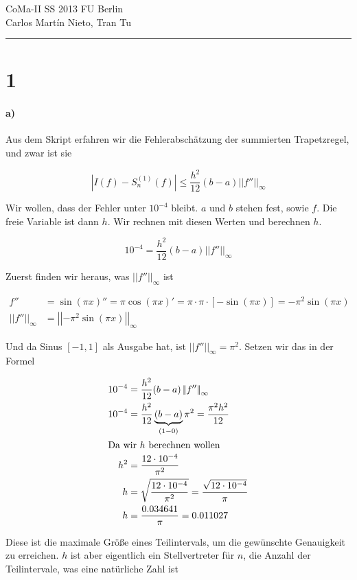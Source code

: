 \documentclass[ngerman,a4paper]{scrartcl}
\newcommand{\norm}[1]{\left|\!\left|#1\right|\! \right|}
\begin{document}
{\sffamily
  \hfill
  CoMa-II SS 2013\hfill
  FU Berlin\\[8pt]
  \hfill Carlos Martín Nieto, Tran Tu\hrule \bigskip
}

\section*{1}

\paragraph{a)}

Aus dem Skript erfahren wir die Fehlerabschätzung der summierten Trapetzregel, und zwar ist sie

\[
|I(f) - S^{(1)}_n(f)| \leq \frac{h^2}{12}(b-a)\norm{f''}_\infty
\]

Wir wollen, dass der Fehler unter $10^{-4}$ bleibt. $a$ und $b$ stehen fest, sowie $f$. Die freie Variable ist dann $h$. Wir rechnen mit diesen Werten und berechnen $h$.

\[
  10^{-4} = \frac{h^2}{12} (b-a) \norm{f''}_\infty
\]

Zuerst finden wir heraus, was $\norm{f''}_\infty$ ist


\begin{align*}
  f'' &= \sin(\pi x)'' = \pi \cos(\pi x)' = \pi \cdot \pi \cdot       [-\sin(\pi x)] = -\pi^2 \sin(\pi x)\\
\norm{f''}_\infty &= \norm{-\pi^2 \sin(\pi x)}_\infty
\end{align*}

Und da Sinus $[-1, 1]$ als Ausgabe hat, ist $\norm{f''}_\infty = \pi^2$. Setzen wir das in der Formel

\begin{align*}
  10^{-4} &= \frac{h^2}{12} (b-a) \norm{f''}_\infty\\
  10^{-4} &= \frac{h^2}{12} \underbrace{(b-a)}_{(1 - 0)} \pi^2 = \frac{\pi^2 h^2}{12}\\
\intertext{Da wir $h$ berechnen wollen}
h^2 &= \frac{12\cdot 10^{-4}}{\pi^2}\\
h &= \sqrt{\frac{12\cdot 10^{-4}}{\pi^2}} = \frac{\sqrt{12\cdot 10^{-4}}}{\pi}\\
h &= \frac{0.034641}{\pi} = 0.011027
\end{align*}

Diese ist die maximale Größe eines Teilintervals, um die gewünschte Genauigkeit zu erreichen. $h$ ist aber eigentlich ein Stellvertreter für $n$, die Anzahl der Teilintervale, was eine natürliche Zahl ist
\end{document}
